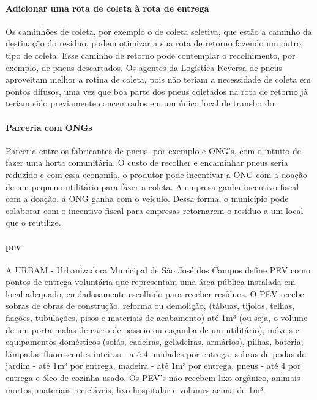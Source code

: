 \paragraph{\textbf{Adicionar uma rota de coleta à rota de entrega}}
Os caminhões de coleta, por exemplo o de coleta seletiva, que estão a caminho da destinação do resíduo, podem otimizar a sua rota de retorno fazendo um outro tipo de coleta. Esse caminho de retorno pode contemplar o recolhimento, por exemplo, de pneus descartados. Os agentes da Logística Reversa de pneus aproveitam melhor a rotina de coleta, pois não teriam a necessidade de coleta em pontos difusos, uma vez que boa parte dos pneus coletados na rota de retorno já teriam sido previamente concentrados em um único local de transbordo. 

\paragraph{\textbf{Parceria com ONGs}}
Parceria entre os fabricantes de pneus, por exemplo e ONG’s, com o intuito de fazer uma horta comunitária. O custo de recolher e encaminhar pneus seria reduzido e com essa economia, o produtor pode incentivar a ONG com a doação de um pequeno utilitário para fazer a coleta. A empresa ganha incentivo fiscal com a doação, a ONG ganha com o veículo. Dessa forma, o município pode colaborar com o incentivo fiscal para empresas retornarem o resíduo a um local que o reutilize.

\paragraph{\textbf{\gls{pev}}}
A URBAM - Urbanizadora Municipal de São José dos Campos define PEV como pontos de entrega voluntária que representam uma área pública instalada em local adequado, cuidadosamente escolhido para receber resíduos. O PEV recebe sobras de obras de construção, reforma ou demolição, (tábuas, tijolos, telhas, fiações, tubulações, pisos e materiais de acabamento) até 1m³ (ou seja, o volume de um porta-malas de carro de passeio ou caçamba de um utilitário), móveis e equipamentos domésticos (sofás, cadeiras, geladeiras, armários), pilhas, bateria; lâmpadas fluorescentes inteiras - até 4 unidades por entrega, sobras de podas de jardim - até 1m³ por entrega, madeira - até 1m³ por entrega, pneus - até 4 por entrega e óleo de cozinha usado. Os PEV’s não recebem lixo orgânico, animais mortos, materiais recicláveis, lixo hospitalar e volumes acima de 1m³.

